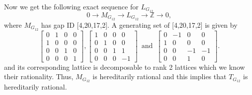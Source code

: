 \documentclass{article}
\theoremstyle{plain}
\theoremstyle{definition}
\newcommand{\Z}{\ensuremath{\mathbb{Z}}}
\newcommand{\tand}{\ensuremath{\,\,\, \text{and} \,\,\,}}
\newcommand{\exactseq}[1]{\ensuremath{0 \longrightarrow M_{#1} \longrightarrow L_{#1} \longrightarrow \Z \longrightarrow 0}}
\begin{document}
Now we get the following exact sequence for $L_{G_{12}}$
$$
\exactseq{G_{12}},
$$
where $M_{G_{12}}$ has gap ID [4,20,17,2]. A generating set of [4,20,17,2] is given by  
$$
\left[ \begin {array}{cccc} 0&1&0&0\\ 1&0&0&0
\\ 0&0&1&0\\ 0&0&0&1\end {array}
 \right] ,
 \left[ \begin {array}{cccc} 1&0&0&0\\ 0&1&0&0
\\ 0&0&1&1\\ 0&0&0&-1\end {array}
 \right] 
 \tand
 \left[ \begin {array}{cccc} 0&-1&0&0\\ 1&0&0&0
\\ 0&0&-1&-1\\ 0&0&1&0\end {array}
 \right].
$$
and its corresponding lattice is decomposable to rank 2 lattices which we know their rationality. Thus, $M_{G_{12}}$ is hereditarily rational and this implies that $T_{G_{12}}$ is hereditarily rational.
\bigskip
%
%
%
%
%  
\end{document}
